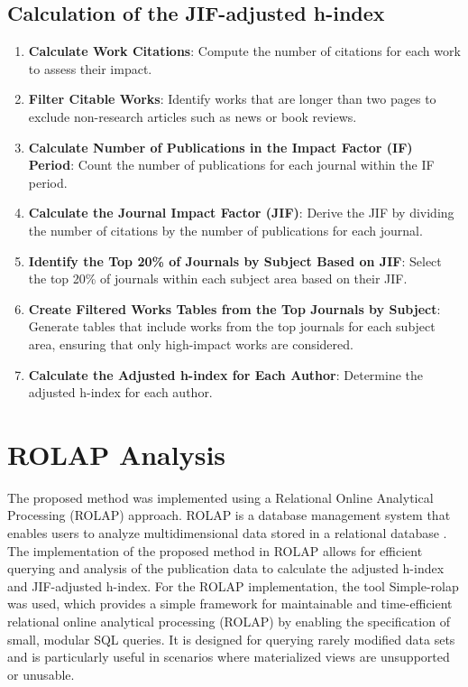 \subsection{Calculation of the JIF-adjusted h-index}
\begin{enumerate}
    \item \textbf{Calculate Work Citations}: Compute the number of citations for each work to assess their impact.

    \item \textbf{Filter Citable Works}: Identify works that are longer than two pages to exclude non-research articles such as news or book reviews.

    \item \textbf{Calculate Number of Publications in the Impact Factor (IF) Period}: Count the number of publications
          for each journal within the IF period.

    \item \textbf{Calculate the Journal Impact Factor (JIF)}: Derive the JIF by dividing the number of citations by
          the number of publications for each journal.

    \item \textbf{Identify the Top 20\% of Journals by Subject Based on JIF}: Select the top 20\% of journals within
          each subject area based on their JIF\@.

    \item \textbf{Create Filtered Works Tables from the Top Journals by Subject}: Generate tables that include works from
          the top journals for each subject area, ensuring that only high-impact works are considered.


    \item \textbf{Calculate the Adjusted h-index for Each Author}: Determine the adjusted h-index for each author.
\end{enumerate}

\section{ROLAP Analysis}

The proposed method was implemented using a Relational Online Analytical
Processing (ROLAP) approach. ROLAP is a database management system that enables
users to analyze multidimensional data stored in a relational database
\cite{codd1993providing}. The implementation of the proposed method in ROLAP
allows for efficient querying and analysis of the publication data to calculate
the adjusted h-index and JIF-adjusted h-index. For the ROLAP implementation,
the tool Simple-rolap \cite{simple-rolap} was used, which provides a simple
framework for maintainable and time-efficient relational online analytical
processing (ROLAP) by enabling the specification of small, modular SQL queries.
It is designed for querying rarely modified data sets and is particularly
useful in scenarios where materialized views are unsupported or unusable.

